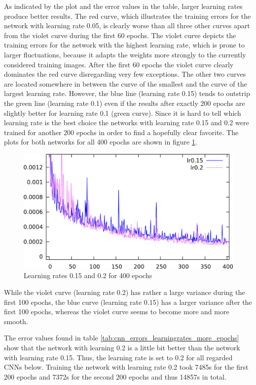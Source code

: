 \documentclass[11pt, a4paper]{article}
\begin{document}


As indicated by the plot and the error values in the table, larger learning rates produce better results. The red curve, which illustrates the training errors for the network with learning rate 0.05, is clearly worse than all three other curves apart from the violet curve during the first 60 epochs. The violet curve depicts the training errors for the network with the highest learning rate, which is prone to larger fluctuations, because it adapts the weights more strongly to the currently considered training images. After the first 60 epochs the violet curve clearly dominates the red curve disregarding very few exceptions. The other two curves are located somewhere in between the curve of the smallest and the curve of the largest learning rate. However, the blue line (learning rate 0.15) tends to outstrip the green line (learning rate 0.1) even if the results after exactly 200 epochs are slightly better for learning rate 0.1 (green curve). Since it is hard to tell which learning rate is the best choice the networks with learning rate 0.15 and 0.2 were trained for another 200 epochs in order to find a hopefully clear favorite. The plots for both networks for all 400 epochs are shown in figure \ref{fig:cnn_learningrates_400}.

\begin{figure}[h!]
	\centering
	\includegraphics[width=\textwidth]{results/cnn_learningrates_400.png}
	\caption{Learning rates 0.15 and 0.2 for 400 epochs}
	\label{fig:cnn_learningrates_400}
\end{figure}

While the violet curve (learning rate 0.2) has rather a large variance during the first 100 epochs, the blue curve (learning rate 0.15) has a larger variance after the first 100 epochs, whereas the violet curve seems to become more and more smooth. 

The error values found in table \ref{tab:cnn_errors_learningrates_more_epochs} show that the network with learning 0.2 is a little bit better than the network with learning rate 0.15. Thus, the learning rate is set to 0.2 for all regarded \acp{CNN} below. Training the network with learning rate 0.2 took 7485s for the first 200 epochs and 7372s for the second 200 epochs and thus 14857s in total.
\end{document}
